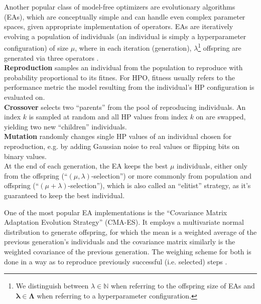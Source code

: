 \documentclass[twoside,11pt]{article}
\begin{document}
Another popular class of model-free optimizers are evolutionary algorithms (EAs), which are conceptually simple and can handle even complex parameter spaces,
given appropriate implementation of operators.
EAs are iteratively evolving a population of individuals (an individual is simply a hyperparameter configuration) of size $\mu$, where in each iteration (generation),
$\lambda$\footnote{We distinguish between $\lambda\in\mathbb{N}$ when referring to the offspring size of EAs and $\boldsymbol\lambda\in\boldsymbol\Lambda$ when
referring to a hyperparameter configuration.} offspring are generated via three operators \citep[pp. 10-14]{genetic_algos}.
\\
\textbf{Reproduction} samples an individual from the population to reproduce with probability proportional to its fitnes. For HPO, fitness usually refers to the
performance metric the model resulting from the individual's HP configuration is evaluated on.
\\
\textbf{Crossover} selects two ``parents'' from the pool of reproducing individuals. An index $k$ is sampled at random and all HP values from
index $k$ on are swapped, yielding two new ``children'' individuals.
\\
\textbf{Mutation} randomly changes single HP values of an individual chosen for reproduction, e.g. by adding Gaussian noise to real values or flipping bits
on binary values.
\\
At the end of each generation, the EA keeps the best $\mu$ individuals, either only from the offspring (``$(\mu,\lambda)$-selection'') or more commonly from
population and offspring (``$(\mu+\lambda)$-selection''), which is also called an ``elitist'' strategy, as it's guaranteed to keep the best individual.
\citep[chap. 1.3]{feurer_hyperparameter_2019}

One of the most popular EA implementations is the ``Covariance Matrix Adaptation Evolution Strategy'' (CMA-ES).
It employs a multivariate normal distribution to generate offspring, for which the mean is a weighted average of the previous generation's individuals
and the covariance matrix similarly is the weighted covariance of the previous generation.
The weighing scheme for both is done in a way as to reproduce previously successful (i.e. selected) steps \citep[p. 8-11]{hansen2023cmaevolutionstrategytutorial}.
\end{document}
